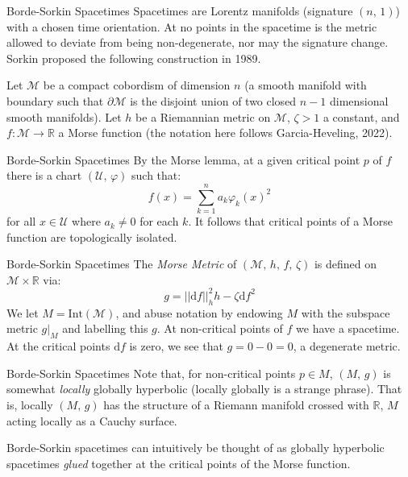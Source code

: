 \documentclass{beamer}
\begin{document}
    \begin{frame}{Borde-Sorkin Spacetimes}
        Spacetimes are Lorentz manifolds (signature $(n,\,1)$) with a chosen
        time orientation. At no points in the spacetime is the metric allowed
        to deviate from being non-degenerate, nor may the signature change.
        Sorkin proposed the following construction in 1989.
        \par\hfill\par
        Let $\mathcal{M}$ be a compact cobordism of dimension $n$
        (a smooth manifold with boundary such that $\partial\mathcal{M}$ is the
        disjoint union of two closed $n-1$ dimensional smooth manifolds). Let
        $h$ be a Riemannian metric on $\mathcal{M}$, $\zeta>1$ a constant, and
        $f:\mathcal{M}\rightarrow\mathbb{R}$ a Morse function
        (the notation here follows Garcia-Heveling, 2022).
    \end{frame}
    \begin{frame}{Borde-Sorkin Spacetimes}
        By the Morse lemma, at a given critical point $p$ of $f$ there is a
        chart $(\mathcal{U},\,\varphi)$ such that:
        \begin{equation}
    	    f(x)=\sum_{k=1}^{n}a_{k}\varphi_{k}(x)^{2}
        \end{equation}
        for all $x\in\mathcal{U}$ where $a_{k}\ne{0}$ for each $k$. It follows
        that critical points of a Morse function are topologically isolated.
    \end{frame}
    \begin{frame}{Borde-Sorkin Spacetimes}
        The \textit{Morse Metric} of $(\mathcal{M},\,h,\,f,\,\zeta)$ is
        defined on $\mathcal{M}\times\mathbb{R}$ via:
        \begin{equation}
            g=||\textrm{d}f||^{2}_{h}h-\zeta\textrm{d}f^{2}
        \end{equation}
        We let $M=\textrm{Int}(\mathcal{M})$, and
        abuse notation by endowing $M$ with the subspace metric
        $g|_{M}$ and labelling this $g$. At non-critical points of $f$ we have
        a spacetime. At the critical points $\textrm{d}f$ is zero, we see that
        $g=0-0=0$, a degenerate metric.
    \end{frame}
    \begin{frame}{Borde-Sorkin Spacetimes}
        Note that, for non-critical points $p\in{M}$, $(M,\,g)$ is somewhat
        \textit{locally} globally hyperbolic (locally globally is a strange
        phrase). That is, locally $(M,\,g)$ has the structure of a Riemann
        manifold crossed with $\mathbb{R}$,
        $M$ acting locally as a Cauchy surface.
        \par\hfill\par
        Borde-Sorkin spacetimes can intuitively be thought of as
        globally hyperbolic spacetimes \textit{glued} together at the
        critical points of the Morse function.
    \end{frame}
\end{document}
